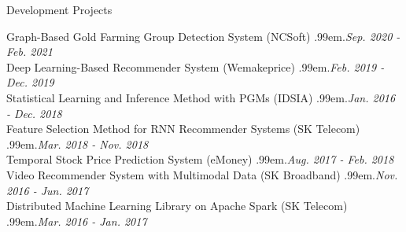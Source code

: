\documentclass{resume} %
\makeatletter
\newcommand \Dotfill {\leavevmode \cleaders \hb@xt@ .99em{\hss .\hss }\hfill \kern \z@}
\makeatother
\begin{document}
\begin{rSection}{Development Projects}

Graph-Based Gold Farming Group Detection System (NCSoft) \smallskip \Dotfill \emph{Sep. 2020 - Feb. 2021} \\ 
Deep Learning-Based Recommender System (Wemakeprice) \smallskip \Dotfill \emph{Feb. 2019 - Dec. 2019} \\ 
Statistical Learning and Inference Method with PGMs (IDSIA) \smallskip \Dotfill \emph{Jan. 2016 - Dec. 2018} \\ 
Feature Selection Method for RNN Recommender Systems (SK Telecom) \smallskip \Dotfill \emph{Mar. 2018 - Nov. 2018} \\ 
Temporal Stock Price Prediction System (eMoney) \smallskip \Dotfill \emph{Aug. 2017 - Feb. 2018} \\ 
Video Recommender System with Multimodal Data (SK Broadband) \smallskip \Dotfill \emph{Nov. 2016 - Jun. 2017} \\ 
Distributed Machine Learning Library on Apache Spark (SK Telecom) \smallskip \Dotfill \emph{Mar. 2016 - Jan. 2017}

\end{rSection}

\end{document}
